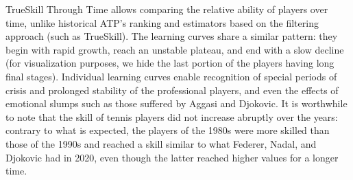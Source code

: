 \documentclass[article]{jss}
\begin{document}
TrueSkill Through Time allows comparing the relative ability of players over time, unlike historical ATP's ranking and estimators based on the filtering approach (such as TrueSkill).
The learning curves share a similar pattern: they begin with rapid growth, reach an unstable plateau, and end with a slow decline (for visualization purposes, we hide the last portion of the players having long final stages). 
Individual learning curves enable recognition of special periods of crisis and prolonged stability of the professional players, and even the effects of emotional slumps such as those suffered by Aggasi and Djokovic. 
It is worthwhile to note that the skill of tennis players did not increase abruptly over the years: contrary to what is expected, the players of the 1980s were more skilled than those of the 1990s and reached a skill similar to what Federer, Nadal, and Djokovic had in 2020, even though the latter reached higher values for a longer time.

\end{document}

